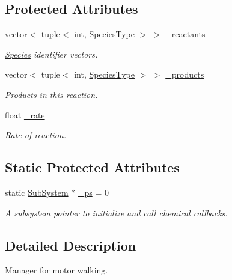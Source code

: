\subsection*{Protected Attributes}
\begin{DoxyCompactItemize}
\item 
vector$<$ tuple$<$ int, \hyperlink{Species_8h_a50651af47c56ea0e27235468d23542cf}{Species\+Type} $>$ $>$ \hyperlink{classInternalFilamentRxnManager_a63de9061c3da4ad03cf4c530d2774979}{\+\_\+reactants}
\begin{DoxyCompactList}\small\item\em \hyperlink{classSpecies}{Species} identifier vectors. \end{DoxyCompactList}\item 
vector$<$ tuple$<$ int, \hyperlink{Species_8h_a50651af47c56ea0e27235468d23542cf}{Species\+Type} $>$ $>$ \hyperlink{classInternalFilamentRxnManager_afd213da1a3706e2e88962e5da886a5dc}{\+\_\+products}
\begin{DoxyCompactList}\small\item\em Products in this reaction. \end{DoxyCompactList}\item 
float \hyperlink{classInternalFilamentRxnManager_a8b98dd9e6f5d016149f5434b891806df}{\+\_\+rate}
\begin{DoxyCompactList}\small\item\em Rate of reaction. \end{DoxyCompactList}\end{DoxyCompactItemize}
\subsection*{Static Protected Attributes}
\begin{DoxyCompactItemize}
\item 
static \hyperlink{classSubSystem}{Sub\+System} $\ast$ \hyperlink{classInternalFilamentRxnManager_a973ce9cc2aae811e6867afa46193c5f2}{\+\_\+ps} = 0
\begin{DoxyCompactList}\small\item\em A subsystem pointer to initialize and call chemical callbacks. \end{DoxyCompactList}\end{DoxyCompactItemize}


\subsection{Detailed Description}
Manager for motor walking. 

